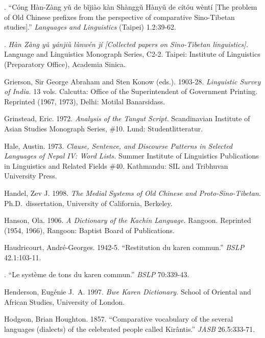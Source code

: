 .
 “Cóng Hàn-Zàng yǔ de bǐjiào kàn Shànggǔ Hànyǔ de cítóu wèntí [The problem of Old Chinese preﬁxes from the perspective of comparative Sino-Tibetan studies].” \textit{Languages and Linguistics} (Taipei) 1.2:39-62.

.
 \textit{Hàn Zàng yǔ yánjiù lùnwén jí [Collected papers on Sino-Tibetan linguistics].}
Language and Linguistics Monograph Series, C2-2. Taipei: Institute of Linguistics (Preparatory Office), Academia Sinica.


Grierson, Sir George Abraham and Sten Konow (eds.).
1903-28.
\textit{Linguistic Survey of India.}
13 vols. Calcutta: Office of the Superintendent of Government Printing. Reprinted (1967, 1973), Delhi: Motilal Banarsidass.

Grinstead, Eric.
1972.
\textit{Analysis of the Tangut Script.}
Scandinavian Institute of Asian Studies Monograph Series, \#10.  Lund: Studentlitteratur.

Hale, Austin.
1973.
\textit{Clause, Sentence, and Discourse Patterns in Selected Languages of Nepal IV: Word Lists.}
Summer Institute of Linguistics Publications in Linguistics and Related Fields \#40. Kathmandu: SIL and Tribhuvan University Press.

Handel, Zev J.
1998.
\textit{The Medial Systems of Old Chinese and Proto-Sino-Tibetan.}
Ph.D.\ dissertation, University of California, Berkeley.

Hanson, Ola.
1906.
\textit{A Dictionary of the Kachin Language.}
Rangoon. Reprinted (1954, 1966), Rangoon: Baptist Board of Publications.

Haudricourt, André-Georges.
1942-5.
“Restitution du karen commun.”
\textit{BSLP} 42.1:103-11.

.
“Le système de tons du karen commun.”
\textit{BSLP} 70:339-43.

Henderson, Eugénie J.~A.
1997.
\textit{Bwe Karen Dictionary.}
School of Oriental and African Studies, University of London.

Hodgson, Brian Houghton.
1857.
“Comparative vocabulary of the several languages (dialects) of the celebrated people called Kirântis.”
\textit{JASB} 26.5:333-71.

